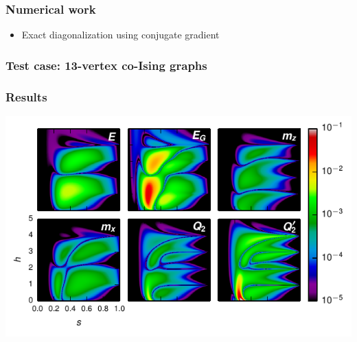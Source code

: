 \documentclass{beamer}
\begin{document}
\begin{frame}
  \frametitle{Numerical work}
  \begin{itemize}
    \item Exact diagonalization using conjugate gradient
  \end{itemize}
\end{frame}
\begin{frame}
  \frametitle{Test case: 13-vertex co-Ising graphs}
\end{frame}
\begin{frame}
  \frametitle{Results}
  \includegraphics[width=\textwidth]{delta-grid}
\end{frame}
\end{document}
